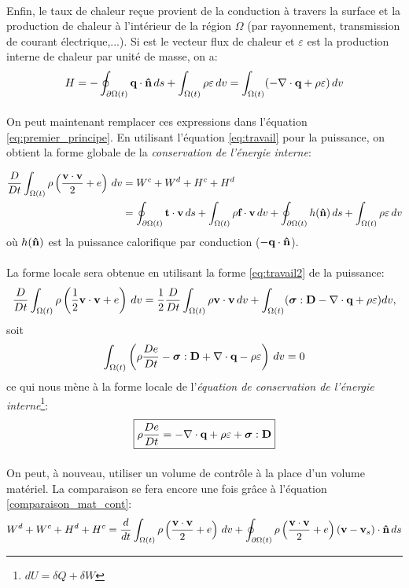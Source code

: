 \paragraph{}
Enfin, le taux de chaleur reçue provient de la conduction à travers la surface et la production de chaleur à l'intérieur de la région $\Omega$ (par rayonnement, transmission de courant électrique,...). Si  est le vecteur flux de chaleur et $\varepsilon$ est la production interne de chaleur par unité de masse, on a:
$$H=-\oint_{\partial \Omega (t)}\textbf{q}\cdot\textbf{\^n}\,ds+\int_{\Omega(t)}\rho\varepsilon\,dv=\int_{\Omega (t)}(-\nabla\cdot\textbf{q}+\rho\varepsilon)\,dv$$
\paragraph{}
On peut maintenant remplacer ces expressions dans l'équation \ref{eq:premier_principe}. En utilisant l'équation \ref{eq:travail} pour la puissance, on obtient la forme globale de la \emph{conservation de l'énergie interne}:


\begin{align}
\frac{D}{Dt}\int_{\Omega (t)}\rho\left(\frac{\textbf{v}\cdot\textbf{v}}{2}+e\right)\,dv&= W^c+W^d+H^c+H^d\\
 &=\oint_{\partial \Omega (t)}\textbf{t}\cdot\textbf{v}\,ds+\int_{\Omega (t)}\rho\textbf{f}\cdot\textbf{v}\,dv+\oint_{\partial \Omega (t)}h(\textbf{\^n})\,ds+\int_{\Omega (t)}\rho\varepsilon\,dv
\end{align}
où $h(\textbf{\^n})$ est la puissance calorifique par conduction ($-\textbf{q}\cdot\textbf{\^n}$).
\paragraph{}
La forme locale sera obtenue en utilisant la forme \ref{eq:travail2} de la puissance:
$$\frac{D}{Dt}\int_{\Omega  (t)}\rho\left(\frac{1}{2}\textbf{v}\cdot\textbf{v}+e\right)\,dv=\frac{1}{2}\frac{D}{Dt}\int_{\Omega (t)}\rho\textbf{v}\cdot\textbf{v}\,dv+\int_{\Omega (t)}(\boldsymbol{\sigma}:\textbf{D}-\nabla\cdot\textbf{q}+\rho\varepsilon)dv,$$
soit
$$\int_{\Omega (t)}\left(\rho\frac{De}{Dt}-\boldsymbol{\sigma}:\textbf{D}+\nabla\cdot\textbf{q}-\rho\varepsilon\right)\,dv=0$$
ce qui nous mène à la forme locale de l'\emph{équation de conservation de l'énergie interne}\footnote{$dU=\delta Q+\delta W$}:
$$\boxed{\rho\frac{De}{Dt}=-\nabla\cdot\textbf{q}+\rho\varepsilon+\boldsymbol{\sigma}:\textbf{D}}$$
\paragraph{}
On peut, à nouveau, utiliser un volume de contrôle à la place d'un volume matériel. La comparaison se fera encore une fois grâce à l'équation \ref{comparaison_mat_cont}:
\begin{equation}\label{energie_cont}W^d+W^c+H^d+H^c=\frac{d}{dt}\int_{\Omega (t)}\rho\left(\frac{\textbf{v}\cdot\textbf{v}}{2}+e\right)\,dv+\oint_{\partial\Omega (t)}\rho\left(\frac{\textbf{v}\cdot\textbf{v}}{2}+e\right)(\textbf{v}-\textbf{v}_s)\cdot\textbf{\^n}\,ds\end{equation}

